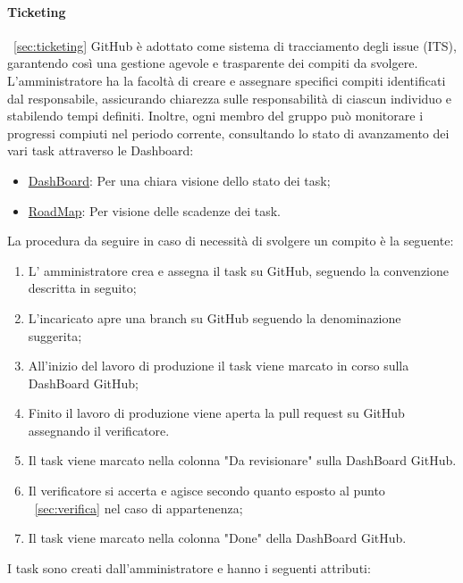\paragraph{Ticketing} ~\ref{sec:ticketing}
GitHub è adottato come sistema di tracciamento degli issue (ITS), garantendo così una gestione agevole e trasparente dei compiti da svolgere. L'amministratore ha la facoltà di creare e assegnare specifici compiti identificati dal responsabile, assicurando chiarezza sulle responsabilità di ciascun individuo e stabilendo tempi definiti. Inoltre, ogni membro del gruppo può monitorare i progressi compiuti nel periodo corrente, consultando lo stato di avanzamento dei vari task attraverso le Dashboard:
\begin{itemize}
    \item \href{https://github.com/orgs/ByteOps-swe/projects/1}{DashBoard}: Per una chiara visione dello stato dei task;
    \item \href{https://github.com/orgs/ByteOps-swe/projects/3}{RoadMap}: Per visione delle scadenze dei task.
\end{itemize}
La procedura da seguire in caso di necessità di svolgere un compito è la seguente:
\begin{enumerate}
    \item L' amministratore crea e assegna il task su GitHub, seguendo la convenzione descritta in seguito;
    \item L'incaricato apre una branch su GitHub seguendo la denominazione suggerita;
    \item  All'inizio del lavoro di produzione il task viene marcato in corso sulla DashBoard GitHub;
    \item Finito il lavoro di produzione viene aperta la pull request su GitHub assegnando il verificatore.
    \item Il task viene marcato nella colonna "Da revisionare" sulla DashBoard GitHub.
    \item Il verificatore si accerta e agisce secondo quanto esposto al punto ~\ref{sec:verifica} nel caso di appartenenza;
    \item Il task viene marcato nella colonna "Done" della DashBoard GitHub.
\end{enumerate}
I task sono creati dall'amministratore e hanno i seguenti attributi:
